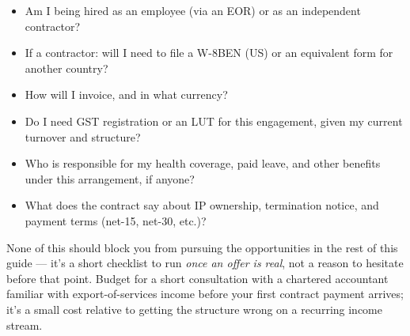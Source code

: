 \begin{itemize}
  \item Am I being hired as an employee (via an EOR) or as an independent contractor?
  \item If a contractor: will I need to file a W-8BEN (US) or an equivalent form for another country?
  \item How will I invoice, and in what currency?
  \item Do I need GST registration or an LUT for this engagement, given my current turnover and structure?
  \item Who is responsible for my health coverage, paid leave, and other benefits under this arrangement, if
  anyone?
  \item What does the contract say about IP ownership, termination notice, and payment terms (net-15, net-30,
  etc.)?
\end{itemize}

\begin{keytakeaway}
None of this should block you from pursuing the opportunities in the rest of this guide — it's a short checklist
to run \emph{once an offer is real}, not a reason to hesitate before that point. Budget for a short consultation
with a chartered accountant familiar with export-of-services income before your first contract payment arrives;
it's a small cost relative to getting the structure wrong on a recurring income stream.
\end{keytakeaway}

